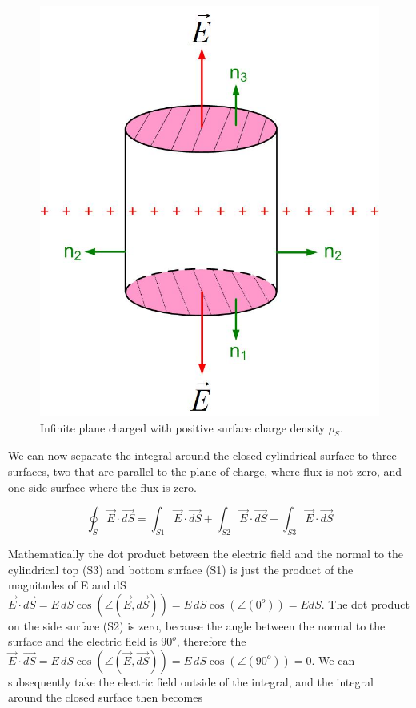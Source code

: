 \documentclass{ximera}
\begin{document}
\begin{figure}[htbp]
\begin{center}
\includegraphics[scale=0.5]{../jpg/infiniteplaneofcharge.jpg}
\end{center}
\caption{Infinite plane charged with positive surface charge density $\rho_S$.}
\label{fig:gaussPlane}
\end{figure}


We can now separate the integral around the closed cylindrical surface to three surfaces, two that are parallel to the plane of charge, where flux is not zero, and one side surface where the flux is zero.

 
\begin{equation}
\oint_S \vec{E} \cdot \vec{dS} = \int_{S1}  \vec{E} \cdot \vec{dS} +\int_{S2}  \vec{E} \cdot \vec{dS}+\int_{S3}  \vec{E} \cdot \vec{dS} 
\end{equation}



 Mathematically the dot product between the electric field and the normal to the cylindrical top (S3) and bottom surface (S1) is just the product of the magnitudes of E and dS $\vec{E} \cdot \vec{dS}= E \,dS  \cos(\angle(\vec{E},\vec{dS}))= E \,dS  \cos(\angle(0^o)) =E dS$. The dot product on the side surface (S2) is zero, because the angle between the normal to the surface and the electric field is $90^o$, therefore the $\vec{E} \cdot \vec{dS}= E \,dS  \cos(\angle(\vec{E},\vec{dS}))= E \,dS  \cos(\angle(90^o)) =0$. We can subsequently take the electric field outside of the integral, and the integral around the closed surface then becomes
 
\end{document}
